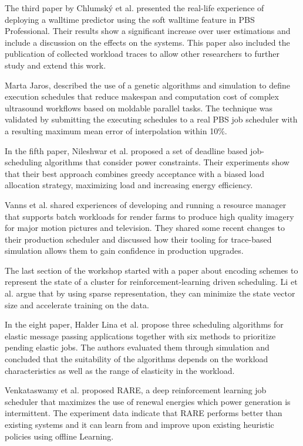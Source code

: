 \documentclass{llncs}
\begin{document}
The third paper by Chlumsk\'y et al. presented the real-life experience of deploying a walltime
predictor using the soft walltime feature in PBS Professional. Their results show a significant
increase over user estimations and include a discussion on the effects on the systems. This paper 
also included the publication of collected workload traces to allow other researchers to further
study and extend this work.

Marta Jaros, described the use of a genetic algorithms and simulation to define execution schedules that
reduce makespan and computation cost of complex ultrasound workflows based on moldable parallel tasks. 
The technique was validated by submitting the executing schedules to a real PBS job scheduler with a 
resulting maximum mean error of interpolation within 10\%. 

In the fifth paper, Nileshwar et al. proposed a set of deadline based job-scheduling algorithms
that consider power constraints. Their experiments show that their best approach combines
greedy acceptance with a biased load allocation strategy, maximizing load and increasing
energy efficiency.

Vanns et al. shared experiences of developing and running a resource manager that supports
batch workloads for render farms to produce high quality imagery for major motion pictures
and television. They shared some recent changes to their production scheduler and discussed
how their tooling for trace-based simulation allows them to gain confidence in production
upgrades.

The last section of the workshop started with a paper about encoding schemes to represent
the state of a cluster for reinforcement-learning driven scheduling. Li et al. argue that
by using sparse representation, they can minimize the state vector size and accelerate
training on the data.

In the eight paper, Halder Lina et al. propose three scheduling algorithms for elastic 
message passing applications together with six methods to prioritize pending elastic jobs.
The authors evaluated them through simulation and concluded that the suitability of the
algorithms depends on the workload characteristics as well as the range of elasticity
in the workload.

Venkataswamy et al. proposed RARE, a deep reinforcement learning job scheduler that 
maximizes the use of renewal energies which power generation is intermittent. The experiment
data indicate that RARE performs better than existing systems and it can learn from and improve
upon existing heuristic policies using offline Learning.
\end{document}
